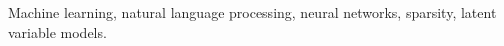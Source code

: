 \begin{keywords}
    Machine learning,
    natural language processing,
    neural networks,
    sparsity,
    latent variable models.
\end{keywords}
\clearpage
\thispagestyle{empty}
\cleardoublepage
\singlespacing